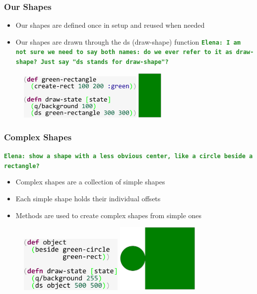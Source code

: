 \documentclass{beamer}
\newcommand{\comment}[1]{{\bf \tt  {#1}}}
\newcommand{\emcomment}[1]{\textcolor{ForestGreen}{\comment{Elena: {#1}}}}
\begin{document}
\begin{frame}
\frametitle{Our Shapes}
	\begin{itemize}
		\item Our shapes are defined once in setup and reused when needed
		\item Our shapes are drawn through the ds (draw-shape) function \emcomment{I am not sure we need to say both names: do we ever refer to it as draw-shape? Just say "ds stands for draw-shape"?}
	\end{itemize}
	\begin{figure}
		\includegraphics[width=6cm]{PresentationImages/ourGreenRectCode.pdf}
		\hspace{1cm}
		\includegraphics[width=1.2cm]{PresentationImages/ourGreenRect.pdf}
	\end{figure}
\end{frame}

\begin{frame}
\frametitle{Complex Shapes}
\emcomment{show a shape with a less obvious center, like a circle beside a rectangle?} 
	\begin{itemize}
		\item Complex shapes are a collection of simple shapes
		\item Each simple shape holds their individual offsets
		\item Methods are used to create complex shapes from simple ones
	\end{itemize}
	\begin{figure}
	\includegraphics[width=5cm]{PresentationImages/greenCircleRectangleCode.pdf}
	\hspace{1cm}
	\includegraphics[width=4cm]{PresentationImages/greenCircleRectangle.pdf}
	\end{figure}
\end{frame}
\end{document}
